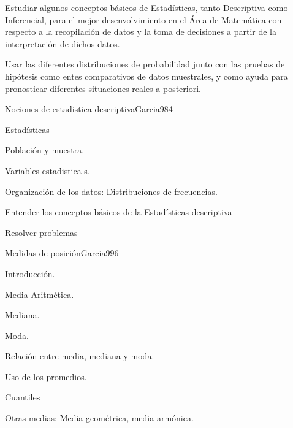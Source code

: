 \begin{syllabus}


\begin{goals}
\item  Estudiar algunos conceptos básicos de Estadísticas, tanto Descriptiva como Inferencial, para el mejor desenvolvimiento en el Área de Matemática con respecto a la recopilación de datos y la toma de decisiones a partir de la interpretación de dichos datos.
\item  Usar las diferentes distribuciones de probabilidad junto con las pruebas de hipótesis como entes comparativos de datos muestrales, y como ayuda para pronosticar diferentes situaciones reales a posteriori.
\end{goals}

\begin{outcomes}
\end{outcomes}

\begin{unit}{Nociones de estadistica  descriptiva}{Garcia98}{4}
   \begin{topics}
         \item  Estadísticas
	 \item  Población y muestra.
	 \item  Variables estadistica s.
         \item  Organización de los datos: Distribuciones de frecuencias.
   \end{topics}

   \begin{learningoutcomes}
         \item  Entender los conceptos básicos de la Estadísticas descriptiva
         \item  Resolver problemas
   \end{learningoutcomes}
\end{unit}

\begin{unit}{Medidas de posición}{Garcia99}{6}
   \begin{topics}
	\item Introducción.
	\item Media Aritmética.
	\item Mediana.
	\item Moda.
	\item Relación entre media, mediana y moda.
	\item Uso de los promedios.
	\item Cuantiles
	\item Otras medias: Media geométrica, media armónica.
   \end{topics}


\end{unit}
\end{syllabus}
